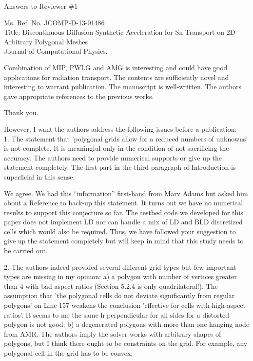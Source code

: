 \documentclass{article}
\begin{document}
\begin{center}
{ \Large Answers to Reviewer \#1}
\end{center}

\bigskip

\noindent Ms. Ref. No. JCOMP-D-13-01486\\
Title: Discontinuous Diffusion Synthetic Acceleration for Sn Transport on 2D Arbitrary Polygonal Meshes \\
Journal of Computational Physics,\\

\bigskip
\bigskip

{
\color{blue}
 Combination of MIP, PWLG and AMG is interesting and could have good applications for radiation transport. The contents are sufficiently novel and interesting to warrant publication. The manuscript is well-written. The authors gave appropriate references to the previous works.
}

Thank you.

\bigskip

{
\color{blue}
However, I want the authors address the following issues before a publication:\\

1. The statement that 'polygonal grids allow for a reduced numbers of unknowns' is not complete. It is meaningful only in the condition of not sacrificing the accuracy. The authors need to provide numerical supports or give up the statement completely. The first part in the third paragraph of Introduction is superficial in this sense.
}

We agree. We had this ``information'' first-hand from Marv Adams but asked him about a Reference to back-up this statement. It turns out we have no numerical results to support this conjecture so far. The testbed code we developed for this paper does not implement LD nor can handle a mix of LD and BLD discretized cells which would also be required. Thus, we have followed your suggestion to give up the statement completely but will keep in mind that this study needs to be carried out. 

\bigskip


{
\color{blue}
2. The authors indeed provided several different grid types but few important types are missing in my opinion:
a) a polygon with number of vertices greater than 4 with bad aspect ratios (Section 5.2.4 is only quadrilateral!). The assumption that 'the polygonal cells do not deviate significantly from regular polygons' on Line 157 weakens the conclusion 'effective for cells with high-aspect ratios'. It seems to me the same h perpendicular for all sides for a distorted polygon is not good;
b) a degenerated polygons with more than one hanging node from AMR.
The authors imply the solver works with arbitrary shapes of polygons, but I think there ought to be constraints on the grid. For example, any polygonal cell in the grid has to be convex.
}
\end{document}
